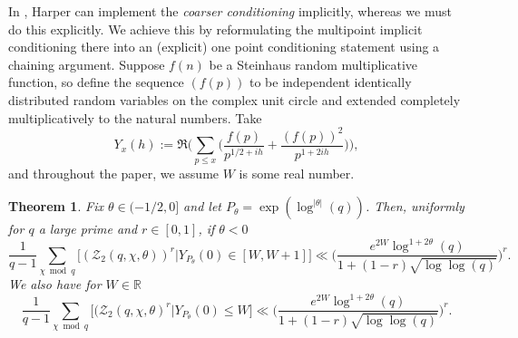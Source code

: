 \documentclass[10pt,a4paper]{amsart}
\newtheorem{theorem}{Theorem}
\numberwithin{equation}{section}
\begin{document}
In \cite{harper2023typicalsizecharacterzeta}, Harper can implement the \textit{coarser conditioning} implicitly, whereas we must do this explicitly. We achieve this by reformulating the multipoint implicit conditioning there into an (explicit) one point conditioning statement using a chaining argument. Suppose $f(n)$ be a Steinhaus random multiplicative function, so define the sequence $(f(p))$ to be independent identically distributed random variables on the complex unit circle and extended completely multiplicatively to the natural numbers. Take
\begin{equation} \label{short_lognormal}
        Y_x(h) := \Re \big(\sum_{p \leq x}\big(\frac{f(p)}{p^{1/2+ih}}+\frac{(f(p))^2}{p^{1+2ih}}\big)\big),
\end{equation}
and throughout the paper, we assume $W$ is some real number.

\begin{theorem}\label{pf_moments_meso}
    Fix $\theta \in (-1/2,0]$ and let $P_\theta = \exp(\log^{|\theta|}(q))$. Then, uniformly for $q$ a large prime and $r \in [0,1]$, if $\theta <0$
    \begin{equation*}
        \frac{1}{q-1}\sum_{\chi \bmod{q}}\big[(\mathcal{Z}_2(q,\chi,\theta))^r\big|Y_{P_\theta}(0) \in [W,W+1]\big] \ll \big(\frac{e^{2W}\log^{1+2\theta}(q)}{1+(1-r)\sqrt{\log\log(q)}}\big)^r.
    \end{equation*}
    We also have for $W \in \mathbb{R}$
    \begin{equation*}
        \frac{1}{q-1}\sum_{\chi \bmod{q}}\big[(\mathcal{Z}_2(q,\chi,\theta)^r\big|Y_{P_\theta}(0) \leq W\big] \ll \big(\frac{e^{2W}\log^{1+2\theta}(q)}{1+(1-r)\sqrt{\log\log(q)}}\big)^r.
    \end{equation*}
\end{theorem}
\end{document}
